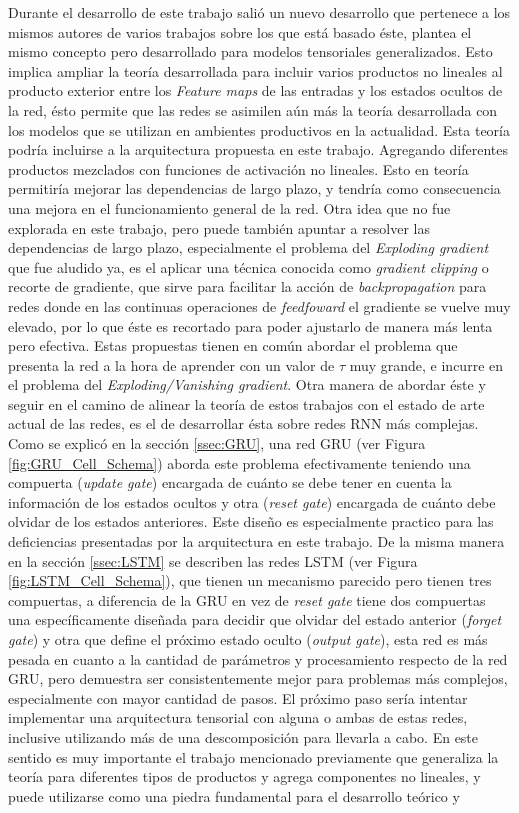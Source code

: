 \documentclass[spanish]{article}
\theoremstyle{definition}
\theoremstyle{remark}
\numberwithin{equation}{section}
\numberwithin{equation}{section} %
\begin{document}
Durante el desarrollo de este trabajo salió un nuevo desarrollo \cite{khrulkov2019generalized} que pertenece a los mismos autores de varios trabajos sobre los que está basado éste, plantea el mismo concepto pero desarrollado para modelos tensoriales generalizados. Esto implica ampliar la teoría desarrollada para incluir varios productos no lineales al producto exterior entre los \textit{Feature maps} de las entradas y los estados ocultos de la red, ésto permite que las redes se asimilen aún más la teoría desarrollada con los modelos que se utilizan en ambientes productivos en la actualidad. Esta teoría podría incluirse a la arquitectura propuesta en este trabajo. Agregando diferentes productos mezclados con funciones de activación no lineales. Esto en teoría permitiría mejorar las dependencias de largo plazo, y tendría como consecuencia una mejora en el funcionamiento general de la red. Otra idea que no fue explorada en este trabajo, pero puede también apuntar a resolver las dependencias de largo plazo, especialmente el problema del \textit{Exploding gradient} que fue aludido ya, es el aplicar una técnica conocida como \textit{gradient clipping} o recorte de gradiente, que sirve para facilitar la acción de \textit{backpropagation} para redes donde en las continuas operaciones de \textit{feedfoward} el gradiente se vuelve muy elevado, por lo que éste es recortado para poder ajustarlo de manera más lenta pero efectiva. Estas propuestas tienen en común abordar el problema que presenta la red a la hora de aprender con un valor de $\tau$ muy grande, e incurre en el problema del \textit{Exploding/Vanishing gradient}. Otra manera de abordar éste y seguir en el camino de alinear la teoría de estos trabajos con el estado de arte actual de las redes, es el de desarrollar ésta sobre redes RNN más complejas. Como se explicó en la sección \ref{ssec:GRU}, una red GRU (ver Figura \ref{fig:GRU_Cell_Schema}) aborda este problema efectivamente teniendo una compuerta (\textit{update gate}) encargada de cuánto se debe tener en cuenta la información de los estados ocultos y otra (\textit{reset gate}) encargada de cuánto debe olvidar de los estados anteriores. Este diseño es especialmente practico para las deficiencias presentadas por la arquitectura en este trabajo. De la misma manera en la sección \ref{ssec:LSTM} se describen las redes LSTM (ver Figura \ref{fig:LSTM_Cell_Schema}), que tienen un mecanismo parecido pero tienen tres compuertas, a diferencia de la GRU en vez de \textit{reset gate} tiene dos compuertas una específicamente diseñada para decidir que olvidar del estado anterior (\textit{forget gate}) y otra que define el próximo estado oculto (\textit{output gate}), esta red es más pesada en cuanto a la cantidad de parámetros y procesamiento respecto de la red GRU, pero demuestra ser consistentemente mejor para problemas más complejos, especialmente con mayor cantidad de pasos. El próximo paso sería intentar implementar una arquitectura tensorial con alguna o ambas de estas redes, inclusive utilizando más de una descomposición para llevarla a cabo. En este sentido es muy importante el trabajo mencionado previamente que generaliza la teoría para diferentes tipos de productos y agrega componentes no lineales, y puede utilizarse como una piedra fundamental para el desarrollo teórico y 
\end{document}
